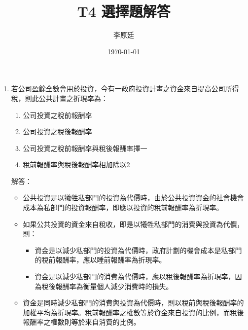 \documentclass[12pt, a4paper]{article}
\begin{document}
\title{T4 選擇題解答} %
\author{李原廷} %
\date{\today} %

\maketitle

\begin{enumerate}

    \item 若公司盈餘全數會用於投資，今有一政府投資計畫之資金來自提高公司所得稅，則此公共計畫之折現率為：
    \begin{enumerate}[label=\Alph*.]
        \item 公司投資之稅前報酬率
        \item 公司投資之稅後報酬率
        \item 公司投資之稅前報酬率與稅後報酬率擇一
        \item 稅前報酬率與稅後報酬率相加除以2
    \end{enumerate}
    解答：
    \begin{itemize}
        \item 公共投資是以犧牲私部門的投資為代價時，由於公共投資資金的社會機會成本為私部門的投資報酬率，即應以投資的稅前報酬率為折現率。
        \item 如果公共投資的資金來自稅收，即是以犧牲私部門的消費與投資為代價，則：
        \begin{itemize}
            \item 資金是以減少私部門的投資為代價時，政府計劃的機會成本是私部門的稅前報酬率，應以睡前報酬率為折現率。
            \item 資金是以減少私部門的消費為代價時，應以稅後報酬率為折現率，因為稅後報酬率為衡量個人減少消費時的損失。
        \end{itemize}
        \item 資金是同時減少私部門的消費與投資為代價時，則以稅前與稅後報酬率的加權平均為折現率。稅前報酬率之權數等於資金來自投資的比例，而稅後報酬率之權數則等於來自消費的比例。
    \end{itemize}


\end{enumerate}
\end{document}
